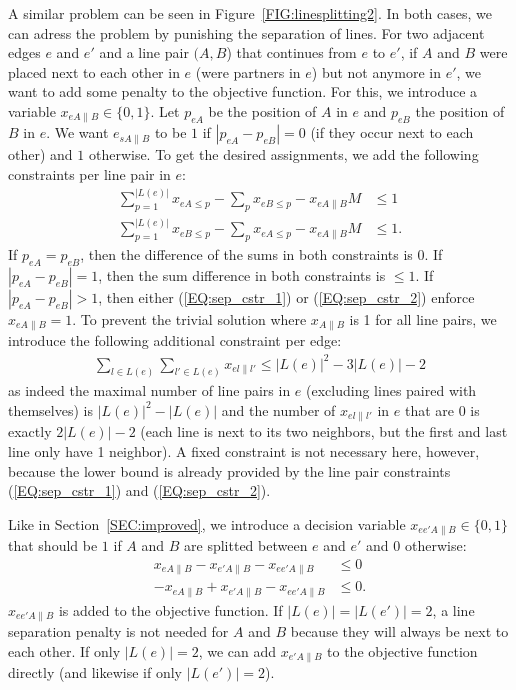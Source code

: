 \documentclass{llncs}
\begin{document}
A similar problem can be seen in Figure~\ref{FIG:linesplitting2}. In both cases, we can adress the problem by punishing the separation of lines. For two adjacent edges $e$ and $e'$ and a line pair $(A, B$) that continues from $e$ to $e'$, if $A$ and $B$ were placed next to each other in $e$ (were partners in $e$) but not anymore in $e'$, we want to add some penalty to the objective function. For this, we introduce a variable $x_{eA\|B} \in \{0, 1\}$. Let $p_{eA}$ be the position of $A$ in $e$ and $p_{eB}$ the position of $B$ in $e$. We want $e_{sA\|B}$ to be $1$ if $\left|p_{eA} - p_{eB}\right| = 0$ (if they occur next to each other) and $1$ otherwise. To get the desired assignments, we add the following constraints per line pair in $e$:
\begin{align}
	\sum_{p=1}^{|L(e)|} x_{eA\leq p} - \sum_{p} x_{eB\leq p} - x_{eA\|B} M &\leq 1 \label{EQ:sep_cstr_1} \\
	\sum_{p=1}^{|L(e)|} x_{eB\leq p} - \sum_{p} x_{eA\leq p} - x_{eA\|B} M &\leq 1. \label{EQ:sep_cstr_2}
\end{align}
If $p_{eA} = p_{eB}$, then the difference of the sums in both constraints is 0. If $|p_{eA} - p_{eB}| = 1$, then the sum difference in both constraints is $\leq 1$. If $|p_{eA} - p_{eB}| > 1$, then either (\ref{EQ:sep_cstr_1}) or (\ref{EQ:sep_cstr_2}) enforce $x_{eA\|B} = 1$. To prevent the trivial solution where $x_{A\|B}$ is 1 for all line pairs, we introduce the following additional constraint per edge:
\begin{align}
	\sum_{l \in L(e)}\sum_{l' \in L(e)} x_{el\|l'} \leq |L(e)|^2 - 3|L(e)| - 2
\end{align}
as indeed the maximal number of line pairs in $e$ (excluding lines paired with themselves) is $|L(e)|^2 - |L(e)|$ and the number of $x_{el\|l'}$ in $e$ that are 0 is exactly $2|L(e)| - 2$ (each line is next to its two neighbors, but the first and last line only have 1 neighbor). A fixed constraint is not necessary here, however, because the lower bound is already provided by the line pair constraints (\ref{EQ:sep_cstr_1}) and (\ref{EQ:sep_cstr_2}).

Like in Section~\ref{SEC:improved}, we introduce a decision variable $x_{ee'A\|B} \in \{0, 1\}$ that should be $1$ if $A$ and $B$ are splitted between $e$ and $e'$ and $0$ otherwise:
\begin{align}
	x_{eA\|B} - x_{e'A\|B} - x_{ee'A\|B} &\leq 0 \\
	-x_{eA\|B} + x_{e'A\|B} - x_{ee'A\|B} &\leq 0.
\end{align}
$x_{ee'A\|B}$ is added to the objective function. If $|L(e)| = |L(e')| = 2$, a line separation penalty is not needed for $A$ and $B$ because they will always be next to each other. If only $|L(e)| = 2$, we can add $x_{e'A\|B}$ to the objective function directly (and likewise if only $|L(e')|=2$).
\end{document}
